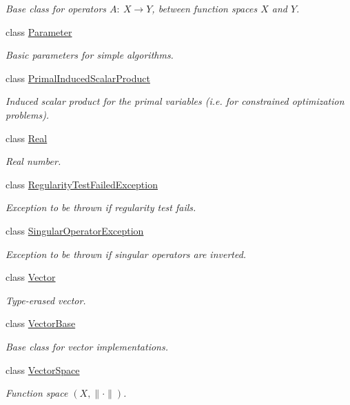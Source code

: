 \begin{DoxyCompactItemize}
\begin{DoxyCompactList}\small\item\em Base class for operators $A:\ X\rightarrow Y$, between function spaces $X$ and $Y$. \end{DoxyCompactList}\item 
class \hyperlink{classSpacy_1_1Parameter}{Parameter}
\begin{DoxyCompactList}\small\item\em Basic parameters for simple algorithms. \end{DoxyCompactList}\item 
class \hyperlink{classSpacy_1_1PrimalInducedScalarProduct}{Primal\+Induced\+Scalar\+Product}
\begin{DoxyCompactList}\small\item\em Induced scalar product for the primal variables (i.\+e. for constrained optimization problems). \end{DoxyCompactList}\item 
class \hyperlink{classSpacy_1_1Real}{Real}
\begin{DoxyCompactList}\small\item\em Real number. \end{DoxyCompactList}\item 
class \hyperlink{classSpacy_1_1RegularityTestFailedException}{Regularity\+Test\+Failed\+Exception}
\begin{DoxyCompactList}\small\item\em Exception to be thrown if regularity test fails. \end{DoxyCompactList}\item 
class \hyperlink{classSpacy_1_1SingularOperatorException}{Singular\+Operator\+Exception}
\begin{DoxyCompactList}\small\item\em Exception to be thrown if singular operators are inverted. \end{DoxyCompactList}\item 
class \hyperlink{classSpacy_1_1Vector}{Vector}
\begin{DoxyCompactList}\small\item\em Type-\/erased vector. \end{DoxyCompactList}\item 
class \hyperlink{classSpacy_1_1VectorBase}{Vector\+Base}
\begin{DoxyCompactList}\small\item\em Base class for vector implementations. \end{DoxyCompactList}\item 
class \hyperlink{classSpacy_1_1VectorSpace}{Vector\+Space}
\begin{DoxyCompactList}\small\item\em Function space $(X,\|\cdot\|)$. \end{DoxyCompactList}\end{DoxyCompactItemize}
